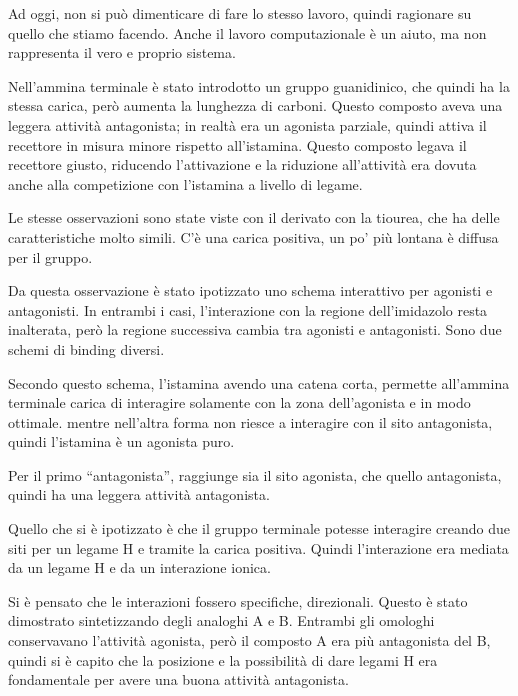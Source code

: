 Ad oggi, non si può dimenticare di fare lo stesso lavoro, quindi
ragionare su quello che stiamo facendo. Anche il lavoro computazionale è
un aiuto, ma non rappresenta il vero e proprio sistema.

Nell'ammina terminale è stato introdotto un gruppo guanidinico, che
quindi ha la stessa carica, però aumenta la lunghezza di carboni. Questo
composto aveva una leggera attività antagonista; in realtà era un
agonista parziale, quindi attiva il recettore in misura minore rispetto
all'istamina. Questo composto legava il recettore giusto, riducendo
l'attivazione e la riduzione all'attività era dovuta anche alla
competizione con l'istamina a livello di legame.

Le stesse osservazioni sono state viste con il derivato con la tiourea,
che ha delle caratteristiche molto simili. C'è una carica positiva, un
po' più lontana è diffusa per il gruppo.

\begingroup{} \endgroup

\clearpage

Da questa osservazione è stato ipotizzato uno schema interattivo per agonisti e antagonisti. In entrambi i casi, l'interazione con la regione
dell'imidazolo resta inalterata, però la regione successiva cambia tra
agonisti e antagonisti. Sono due schemi di binding diversi.

Secondo questo schema, l'istamina avendo una catena corta, permette
all'ammina terminale carica di interagire solamente con la zona
dell'agonista e in modo ottimale. mentre nell'altra forma non riesce a
interagire con il sito antagonista, quindi l'istamina è un agonista
puro.

\begingroup{} \endgroup

Per il primo ``antagonista'', raggiunge sia il sito agonista, che quello
antagonista, quindi ha una leggera attività antagonista.

Quello che si è ipotizzato è che il gruppo terminale potesse interagire
creando due siti per un legame H e tramite la carica positiva. Quindi
l'interazione era mediata da un legame H e da un interazione ionica.

Si è pensato che le interazioni fossero specifiche, direzionali. Questo
è stato dimostrato sintetizzando degli analoghi A e B.
Entrambi gli omologhi conservavano l'attività agonista, però il composto
A era più antagonista del B, quindi si è capito che la posizione e la
possibilità di dare legami H era fondamentale per avere una buona
attività antagonista.

